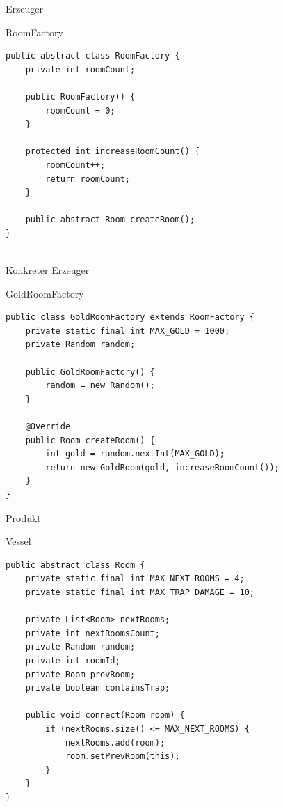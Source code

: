 \begin{frame}[fragile]{Erzeuger}
	\begin{exampleblock}{RoomFactory}
 		\begin{lstlisting}
public abstract class RoomFactory {
	private int roomCount;
	
	public RoomFactory() {
		roomCount = 0;
	}
	
	protected int increaseRoomCount() {
		roomCount++;
		return roomCount;
	}
	
	public abstract Room createRoom();
}
   
 		\end{lstlisting}
 	\end{exampleblock}
\end{frame}

\begin{frame}[fragile]{Konkreter Erzeuger}
	\begin{exampleblock}{GoldRoomFactory}
 		\begin{lstlisting}
public class GoldRoomFactory extends RoomFactory {
	private static final int MAX_GOLD = 1000;
	private Random random;
	
	public GoldRoomFactory() {
		random = new Random();
	}
	
	@Override
	public Room createRoom() {
		int gold = random.nextInt(MAX_GOLD);
		return new GoldRoom(gold, increaseRoomCount());
	}
}
 		\end{lstlisting}
 	\end{exampleblock}
\end{frame}

\begin{frame}[fragile]{Produkt}
	\begin{exampleblock}{Vessel}
 		\begin{lstlisting}
public abstract class Room {
	private static final int MAX_NEXT_ROOMS = 4;
	private static final int MAX_TRAP_DAMAGE = 10;
	
	private List<Room> nextRooms;
	private int nextRoomsCount;
	private Random random;
	private int roomId;
	private Room prevRoom;
	private boolean containsTrap;
	
	public void connect(Room room) {
		if (nextRooms.size() <= MAX_NEXT_ROOMS) {
			nextRooms.add(room);
			room.setPrevRoom(this);
		}
	}
}
 		\end{lstlisting}
 	\end{exampleblock}
\end{frame} 


